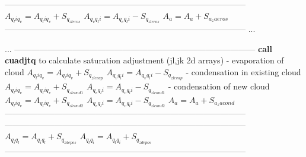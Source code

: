 \documentclass[
a4paper,     %
12pt,        %
article,
onecolumn,   %
openany,     %
]{memoir}
\begin{document}
\begin{algorithm}[H]
\begin{algorithmic}
\Indent
\vspace{-.2cm}
\State ---------------------------------------------------------------------------------------
\vspace{-.2cm}
\State $A_{q_li q_v} = A_{q_li q_v} + S_{q_{zleros}}$
\State $A_{q_v q_li} = A_{q_v q_li} - S_{q_{zleros}}$
\State $A_a = A_a + S_{a_zaeros}$
\vspace{-.2cm}
\State ---------------------------------------------------------------------------------------
\vspace{.4cm}
\EndIndent
\State ...
\end{algorithmic}
\end{algorithm}
%

%
\begin{algorithm}[H]
\begin{algorithmic}
\vspace{.2cm}
\State ...
\vspace{.2cm}
\Indent
\vspace{-.2cm}
\State ---------------------------------------------------------------------------------------
\vspace{-.2cm}
\State \textbf{call cuadjtq} to calculate saturation adjustment (jl,jk 2d arrays)
\State - evaporation of cloud
\State $A_{q_li q_v} = A_{q_li q_v} + S_{q_{zlevap}}$
\State $A_{q_v q_li} = A_{q_v q_li} - S_{q_{zlevap}}$
\State - condensation in existing cloud
\State $A_{q_li q_v} = A_{q_li q_v} + S_{q_{zlcond1}}$
\State $A_{q_v q_li} = A_{q_v q_li} - S_{q_{zlcond1}}$
\State - condensation of new cloud
\State $A_{q_li q_v} = A_{q_li q_v} + S_{q_{zlcond2}}$
\State $A_{q_v q_li} = A_{q_v q_li} - S_{q_{zlcond2}}$
\State $A_a = A_a + S_{a_zacond}$
\vspace{-.2cm}
\State ---------------------------------------------------------------------------------------
\vspace{.4cm}
\EndIndent
{}
\Indent
\vspace{-.2cm}
\State ---------------------------------------------------------------------------------------
\vspace{-.2cm}
\State $A_{q_i q_l} = A_{q_i q_l} + S_{q_{zdepos}}$
\State $A_{q_l q_i} = A_{q_l q_i} + S_{q_{zdepos}}$
\vspace{-.2cm}
\State ---------------------------------------------------------------------------------------
\EndIndent
\end{algorithmic}
\end{algorithm}
%
\end{document}
